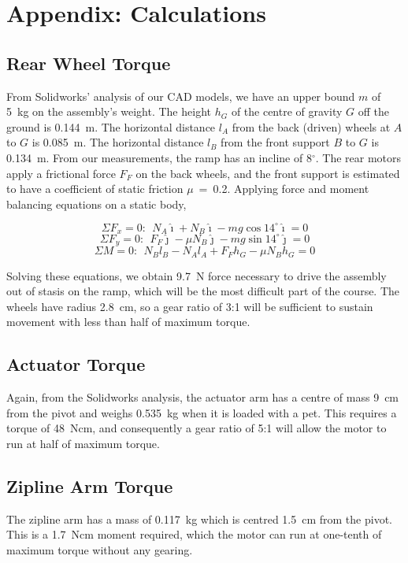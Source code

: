 \newpage
\appendix
\section{Appendix: Calculations}
\label{AppendixA}

	\subsection{Rear Wheel Torque}
	From Solidworks' analysis of our CAD models, we have an upper bound $m$ of 5~kg on the assembly's weight. The height $h_G$ of the centre of gravity $G$ off the ground is 0.144~m. The horizontal distance $l_A$ from the back (driven) wheels at $A$ to $G$ is 0.085~m. The horizontal distance $l_B$ from the front support $B$ to $G$ is 0.134~m. From our measurements, the ramp has an incline of 8$^\circ$. The rear motors apply a frictional force $F_F$ on the back wheels, and the front support is estimated to have a coefficient of static friction $\mu$~=~0.2. Applying force and moment balancing equations on a static body,
	
	$$\Sigma F_x = 0:~~ N_A\hat{\imath} + N_B\hat{\imath} - mg\cos{14^\circ}\hat{\imath} = 0$$
	$$\Sigma F_y = 0:~~ F_F\hat{\jmath} - \mu N_B\hat{\jmath}  - mg\sin{14^\circ}\hat{\jmath} = 0$$
	$$\Sigma M = 0:~~ N_Bl_B - N_Al_A + F_Fh_G - \mu N_Bh_G= 0$$
	
	Solving these equations, we obtain 9.7~N force necessary to drive the assembly out of stasis on the ramp, which will be the most difficult part of the course. The wheels have radius 2.8~cm, so a gear ratio of 3:1 will be sufficient to sustain movement with less than half of maximum torque.
	
	\subsection{Actuator Torque}
	Again, from the Solidworks analysis, the actuator arm has a centre of mass 9~cm from the pivot and weighs 0.535~kg when it is loaded with a pet. This requires a torque of 48~Ncm, and consequently a gear ratio of 5:1 will allow the motor to run at half of maximum torque.
	
	\subsection{Zipline Arm Torque}
	The zipline arm has a mass of 0.117~kg which is centred 1.5~cm from the pivot. This is a 1.7~Ncm moment required, which the motor can run at one-tenth of maximum torque without any gearing.
	
